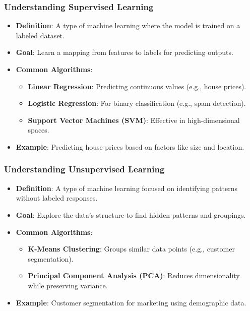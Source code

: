 \documentclass[aspectratio=169]{beamer}
\begin{document}
\begin{frame}[fragile]
    \frametitle{Understanding Supervised Learning}
    \begin{itemize}
        \item \textbf{Definition}: A type of machine learning where the model is trained on a labeled dataset.
        \item \textbf{Goal}: Learn a mapping from features to labels for predicting outputs.
        \item \textbf{Common Algorithms}:
            \begin{itemize}
                \item \textbf{Linear Regression}: Predicting continuous values (e.g., house prices).
                \item \textbf{Logistic Regression}: For binary classification (e.g., spam detection).
                \item \textbf{Support Vector Machines (SVM)}: Effective in high-dimensional spaces.
            \end{itemize}
        \item \textbf{Example}: Predicting house prices based on factors like size and location.
    \end{itemize}
\end{frame}

\begin{frame}[fragile]
    \frametitle{Understanding Unsupervised Learning}
    \begin{itemize}
        \item \textbf{Definition}: A type of machine learning focused on identifying patterns without labeled responses.
        \item \textbf{Goal}: Explore the data's structure to find hidden patterns and groupings.
        \item \textbf{Common Algorithms}:
            \begin{itemize}
                \item \textbf{K-Means Clustering}: Groups similar data points (e.g., customer segmentation).
                \item \textbf{Principal Component Analysis (PCA)}: Reduces dimensionality while preserving variance.
            \end{itemize}
        \item \textbf{Example}: Customer segmentation for marketing using demographic data.
    \end{itemize}
\end{frame}
\end{document}
